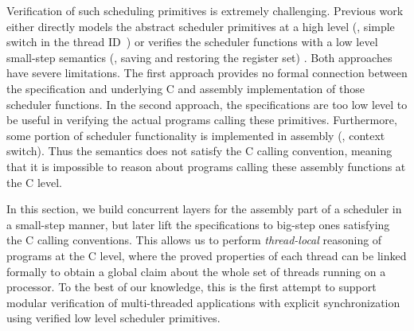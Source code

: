 {\ignore{
\begin{figure}[t]
 = C, multicols=2] {source_code/thread_management.c}
\caption{Implementation of the Scheduler Module}
\label{fig:exp:scheduler}
\hrulefill
    \afterpage{\FloatBarrier}
\end{figure}}

Verification of such scheduling primitives is extremely challenging.
Previous work either directly models the abstract scheduler primitives at a high level
(\eg, simple switch in the thread ID~\cite{xu16})
or verifies the scheduler functions with a low level small-step semantics
(\eg, saving and restoring the register set) \cite{dscal15}.
Both approaches have severe limitations. 
The first approach provides no formal connection
between the specification and underlying C and assembly implementation of those
scheduler functions. In the second approach, the specifications are too low level to
be useful in verifying the actual programs calling these primitives. Furthermore,
some portion of scheduler functionality is implemented in assembly (\eg, context switch).
Thus the semantics does not satisfy the C calling convention, meaning that it 
is impossible to reason about programs calling these assembly functions at the C level.

In this section, we build concurrent layers for the assembly part
of a scheduler in a small-step manner, but later lift the specifications
to big-step ones satisfying the C calling conventions. 
This allows us to perform \emph{thread-local} reasoning of programs
at the C level, where the proved properties of each thread can be linked formally
to obtain a global claim about the whole set of threads running on a processor.
To the best of our knowledge, this is the first attempt 
to support modular verification
of multi-threaded applications with explicit synchronization using verified
low level scheduler primitives.

}
